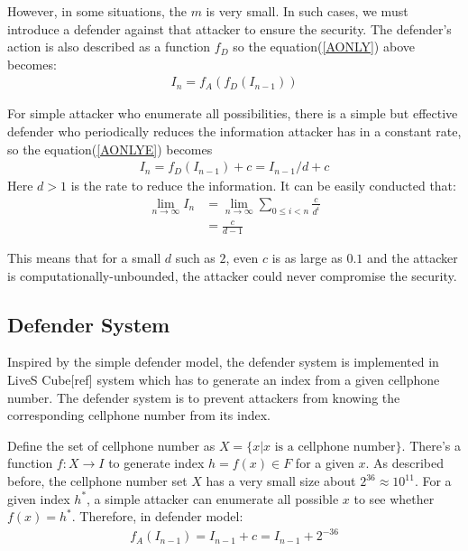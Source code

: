 \documentclass[10pt,a4paper]{article}
\begin{document}
		However, in some situations, the $m$ is very small. In such cases,
		we must introduce a defender against that attacker to ensure the
		security. The defender's action is also described as a function $f_D$
		so the equation(\ref{AONLY}) above becomes:
		\begin{align}
			I_n = f_A(f_D(I_{n-1}))
		\end{align}
		
		For simple attacker who enumerate all possibilities,
		there is a simple but effective defender 
		who periodically reduces the information 
		attacker has in a constant rate, so
		the equation(\ref{AONLYE}) becomes
		\begin{align}
			I_n = f_D(I_{n-1})+c = I_{n-1}/d+c
		\end{align}
		Here $d > 1$ is the rate to reduce the information.
		It can be easily conducted that:
		\begin{align*}
			\lim_{n \rightarrow \infty} I_n &= \lim_{n \rightarrow \infty} \sum_{0 \leq i < n} \frac{c}{d^i}\\
				&= \frac{c}{d-1}
		\end{align*}
		
		This means that for a small $d$ such as $2$, even $c$ is as large as
		$0.1$ and the attacker is computationally-unbounded, the attacker
		could never compromise the security.
		
	\subsection{Defender System}
		Inspired by the simple defender model, the defender system is implemented
		in LiveS Cube[ref] system which has to generate an index
		from a given cellphone number. The defender system is to prevent attackers
		from knowing the corresponding cellphone number from its index.
		
		Define the set of cellphone number as $X = \{x | \text{$x$ is a cellphone number}\}$.
		There's a function $f: X \rightarrow I$ to generate index $h = f(x) \in F$ for
		a given $x$. As described before, the cellphone number set $X$ has a very small
		size about $2^{36} \approx 10^{11}$. For a given index $h^*$, a simple attacker
		can enumerate all possible $x$ to see whether $f(x) = h^*$. Therefore, in defender
		model:
		\begin{align*}
			f_A(I_{n-1}) = I_{n-1}+c = I_{n-1}+2^{-36}
		\end{align*}
		
\end{document}
